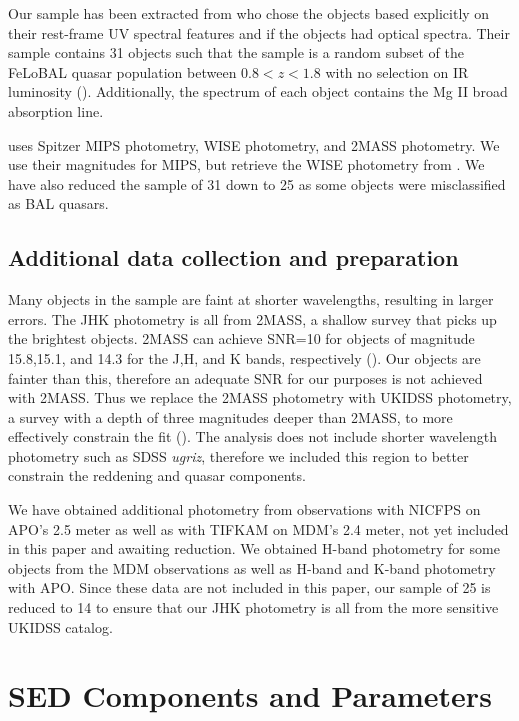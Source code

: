 Our sample has been extracted from \cite{farrah2012} who chose the objects based explicitly on their rest-frame UV spectral 
features and if the objects had optical spectra. Their sample contains 31 objects such that the sample 
is a random subset of the FeLoBAL quasar population between $0.8 < z < 1.8$ with no selection on IR luminosity (\citealp{farrah2012}). 
Additionally, the spectrum of each object contains the Mg II broad absorption line. 

\cite{farrah2012} uses Spitzer MIPS photometry, WISE photometry, and 2MASS photometry. We use their magnitudes for MIPS, but retrieve the 
WISE photometry from \cite{wright2010}. We have also reduced the \cite{farrah2012}  sample of 31 down to 25 as some objects 
were misclassified as BAL quasars. 

\subsection{Additional data collection and preparation}
\label{sec:sample}

Many objects in the \cite{farrah2012} sample are faint at shorter wavelengths, resulting in larger errors. The JHK photometry 
is all from 2MASS, a shallow survey that picks up the brightest objects. 2MASS can achieve SNR=10 for objects of magnitude 15.8,15.1, 
and 14.3 for the J,H, and K bands, respectively (\citealp{skrutskie2006}). Our objects are fainter than this, therefore 
an adequate SNR for our purposes is not 
achieved with 2MASS. Thus we replace the 2MASS photometry with UKIDSS photometry, a survey with a depth of three magnitudes deeper than 
2MASS, to more effectively constrain the fit (\citealp{warren2007}). 
The \cite{farrah2012} analysis does not include shorter wavelength photometry such as SDSS \textit{ugriz}, therefore we included 
this region to better constrain the reddening and quasar components. 

We have obtained additional photometry from observations with NICFPS on APO's 2.5 meter as well as with TIFKAM on MDM's 2.4 meter, 
not yet included in this paper and awaiting reduction. We obtained 
H-band photometry for some objects from the MDM observations as well as H-band and K-band photometry with APO. Since these 
data are not included in this paper, our sample of 25 is reduced to 14 to ensure that our JHK photometry is all from the more sensitive UKIDSS 
catalog.

\section{SED Components and Parameters}
\label{sec:models}

